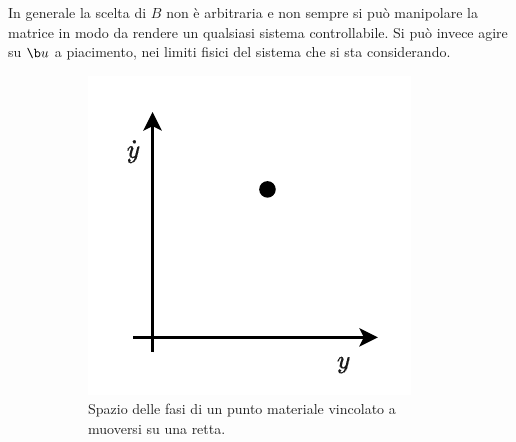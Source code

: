 \begin{example}
    In generale la scelta di $B$ non è arbitraria e non sempre si può
    manipolare la matrice in modo da rendere un qualsiasi sistema controllabile.
    Si può invece agire su $\b u$ a piacimento, nei limiti fisici del sistema
    che si sta considerando.

    \begin{figure}[H]
        \centering
        \vskip 0pt
        \begin{subfigure}[t]{0.30\textwidth}
            \centering
            \includegraphics[width=\textwidth]{assets/ex-pianocartesiano}
            \caption{Spazio delle fasi di un punto materiale vincolato a
            muoversi su una retta.}
            \label{fig:ex-pianocartesiano}
        \end{subfigure}
        \hfill
        \begin{subfigure}[t]{0.30\textwidth}
            \centering

\end{subfigure}
\end{figure}
\end{example}
